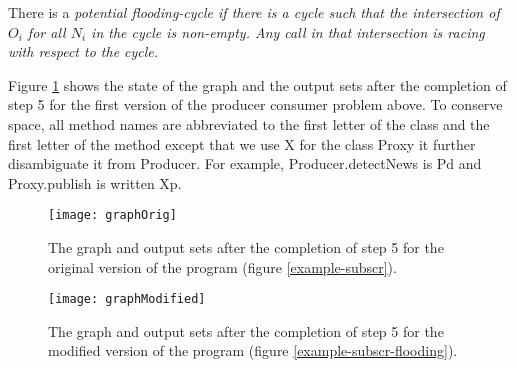\documentclass[12pt]{article}%
\begin{document}
\begin{definition}
\label{potential-flooding-cycle}
There is a \em{potential flooding-cycle} if there is a
cycle such that the intersection of $O_i$ for all $N_i$ in the cycle is non-empty. Any call in that intersection is racing with respect to the cycle.  
\end{definition}
Figure \ref{graph-orig} shows the state of the graph and the output sets
after the completion of step 5 for the first version of the producer consumer problem above. To conserve space, all method names are abbreviated to the
first letter of the class and the first letter of the method except that we use X for the class Proxy it further disambiguate it from Producer. 
For example, Producer.detectNews is Pd and Proxy.publish is written Xp.



\begin{figure}
\texttt{[image: graphOrig]}
\caption{\label{graph-orig}
The graph and output sets after the completion of step 5 for the original version of the program (figure \ref{example-subscr}).
}
\end{figure}

\begin{figure}
\texttt{[image: graphModified]}
\caption{\label{graph-modified}
The graph and output sets after the completion of step 5 for the modified version of the program (figure \ref{example-subscr-flooding}).
}
\end{figure}



% 

%
\end{document}
